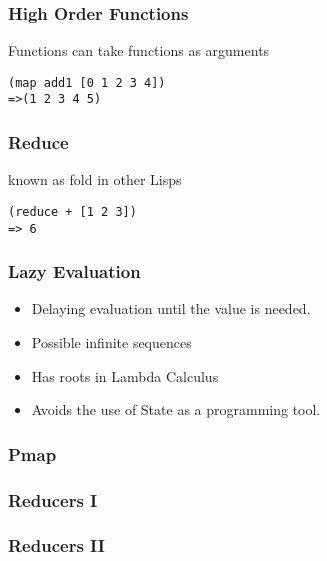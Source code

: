 \documentclass{beamer}
\newcommand{\comment}[1]{{\bf \tt  {#1}}}
\newcommand{\hfcomment}[1]{\textcolor{Teal}{\comment{Henry: {#1}}}}
\begin{document}
\begin{frame}[fragile]
\frametitle{High Order Functions}
{\centering
 Functions can take functions as arguments\par
} 
\begin{verbatim}
(map add1 [0 1 2 3 4])
=>(1 2 3 4 5)
\end{verbatim}
\end{frame}

\begin{frame}[fragile]
\frametitle{Reduce}
known as fold in other Lisps
\begin{verbatim}
(reduce + [1 2 3])
=> 6
\end{verbatim}
\end{frame}

\begin{frame}[fragile]
\frametitle{Lazy Evaluation}
	\begin{itemize}
	  \item Delaying evaluation until the value is needed.
  	  \item Possible infinite sequences
  	  \item Has roots in Lambda Calculus
  	  \item Avoids the use of State as a programming tool.
       \end{itemize}
\end{frame}

\begin{frame}[fragile]
\frametitle{Pmap}
\end{frame}

\begin{frame}[fragile]
\frametitle{Reducers I}
\end{frame}

\begin{frame}[fragile]
\frametitle{Reducers II}
\end{frame}
\end{document}

